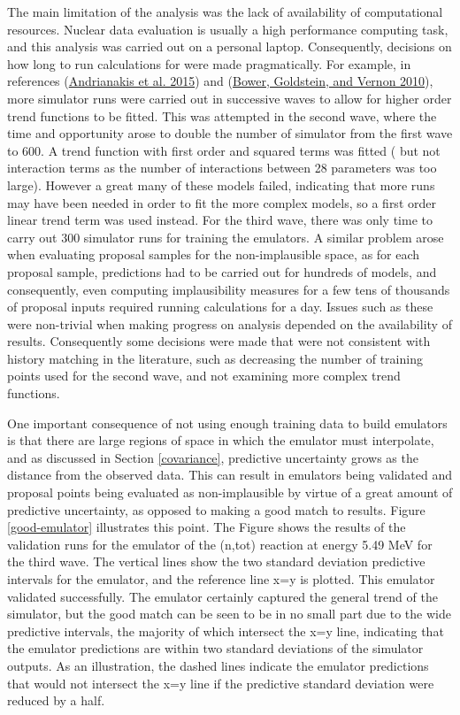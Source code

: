 \documentclass[
  12pt,
  a4paper,
  twoside]{book}
\begin{document}
The main limitation of the analysis was the lack of availability of computational resources. Nuclear data evaluation is usually a high performance computing task, and this analysis was carried out on a personal laptop. Consequently, decisions on how long to run calculations for were made pragmatically. For example, in references (\protect\hyperlink{ref-jeremy_histmatch}{Andrianakis et al. 2015}) and (\protect\hyperlink{ref-bower2010galaxy}{Bower, Goldstein, and Vernon 2010}), more simulator runs were carried out in successive waves to allow for higher order trend functions to be fitted. This was attempted in the second wave, where the time and opportunity arose to double the number of simulator from the first wave to 600. A trend function with first order and squared terms was fitted ( but not interaction terms as the number of interactions between 28 parameters was too large). However a great many of these models failed, indicating that more runs may have been needed in order to fit the more complex models, so a first order linear trend term was used instead. For the third wave, there was only time to carry out 300 simulator runs for training the emulators. A similar problem arose when evaluating proposal samples for the non-implausible space, as for each proposal sample, predictions had to be carried out for hundreds of models, and consequently, even computing implausibility measures for a few tens of thousands of proposal inputs required running calculations for a day. Issues such as these were non-trivial when making progress on analysis depended on the availability of results. Consequently some decisions were made that were not consistent with history matching in the literature, such as decreasing the number of training points used for the second wave, and not examining more complex trend functions.

One important consequence of not using enough training data to build emulators is that there are large regions of space in which the emulator must interpolate, and as discussed in Section \ref{covariance}, predictive uncertainty grows as the distance from the observed data. This can result in emulators being validated and proposal points being evaluated as non-implausible by virtue of a great amount of predictive uncertainty, as opposed to making a good match to results. Figure \ref{good-emulator} illustrates this point. The Figure shows the results of the validation runs for the emulator of the (n,tot) reaction at energy 5.49 MeV for the third wave. The vertical lines show the two standard deviation predictive intervals for the emulator, and the reference line x=y is plotted. This emulator validated successfully. The emulator certainly captured the general trend of the simulator, but the good match can be seen to be in no small part due to the wide predictive intervals, the majority of which intersect the x=y line, indicating that the emulator predictions are within two standard deviations of the simulator outputs. As an illustration, the dashed lines indicate the emulator predictions that would not intersect the x=y line if the predictive standard deviation were reduced by a half.
\end{document}

